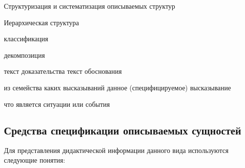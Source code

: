 Структуризация и систематизация описываемых структур

Иерархическая структура
\begin{textitemize}
	\item классификация
	\item декомпозиция
\end{textitemize}

текст доказательства
текст обоснования

\begin{textitemize}
	\item из семейства каких высказываний  данное (специфицируемое) высказывание
	\item что является  ситуации или события
\end{textitemize}

\newpage
\subsection{Средства спецификации описываемых сущностей}
\label{subsec_means_specification__described_entities}
Для представления дидактической информации данного вида используются следующие понятия:

